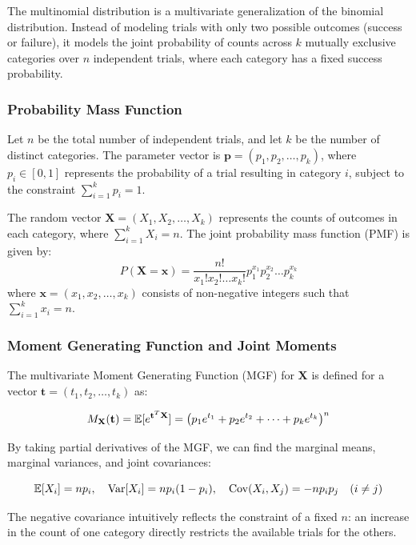 The multinomial distribution is a multivariate generalization of the binomial distribution. Instead of modeling trials with only two possible outcomes (success or failure), it models the joint probability of counts across $k$ mutually exclusive categories over $n$ independent trials, where each category has a fixed success probability.

\subsubsection{Probability Mass Function}
Let $n$ be the total number of independent trials, and let $k$ be the number of distinct categories. The parameter vector is $\mathbf{p} = (p_1, p_2, \dots, p_k)$, where $p_i \in [0, 1]$ represents the probability of a trial resulting in category $i$, subject to the constraint $\sum_{i=1}^k p_i = 1$. 

The random vector $\mathbf{X} = (X_1, X_2, \dots, X_k)$ represents the counts of outcomes in each category, where $\sum_{i=1}^k X_i = n$. The joint probability mass function (PMF) is given by:
\begin{equation}
	P(\mathbf{X} = \mathbf{x}) = \frac{n!}{x_1! x_2! \dots x_k!} p_1^{x_1} p_2^{x_2} \dots p_k^{x_k}
	\label{pmf:multinom}
\end{equation}
where $\mathbf{x} = (x_1, x_2, \dots, x_k)$ consists of non-negative integers such that $\sum_{i=1}^k x_i = n$.

\subsubsection{Moment Generating Function and Joint Moments}
The multivariate Moment Generating Function (MGF) for $\mathbf{X}$ is defined for a vector $\mathbf{t} = (t_1, t_2, \dots, t_k)$ as:

	\[
	M_{\mathbf{X}}(\mathbf{t}) = \mathbb{E}[e^{\mathbf{t}^T \mathbf{X}}] = \left( p_1 e^{t_1} + p_2 e^{t_2} + \dots + p_k e^{t_k} \right)^n
	\]
	
By taking partial derivatives of the MGF, we can find the marginal means, marginal variances, and joint covariances:

	\[
	\mathbb{E}[X_i] = np_i, \quad \operatorname{Var}[X_i] = np_i(1-p_i), \quad \operatorname{Cov}(X_i, X_j) = -np_i p_j \quad (i \neq j)
	\]
	
The negative covariance intuitively reflects the constraint of a fixed $n$: an increase in the count of one category directly restricts the available trials for the others.

